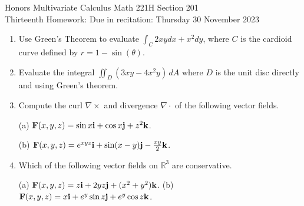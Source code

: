 \documentclass[12pt]{article}
\newcommand{\RR}{{\mathbb R}}  %
\newcommand{\bfF}{{\bf F}}    %
\newcommand{\bfi}{{\bf i}}    %
\newcommand{\bfj}{{\bf j}}    %
\newcommand{\bfk}{{\bf k}}    %
\begin{document}
\LARGE 
\noindent
{\color{Maroon}Honors Multivariate Calculus \hfill Math 221H Section 201}\vspace{2pt}\\
\large
Thirteenth Homework:\hfill 
Due in recitation: Thursday 30 November 2023\vspace{2pt}

\normalsize
    \vspace{2pt}

\begin{enumerate}



\item  
  Use Green's Theorem to evaluate $\int_C 2xy dx + x^2 dy$, where $C$ is the cardioid curve defined by
  $r=1-\sin(\theta)$.\vspace{-2pt}
   
\item
  Evaluate the integral ${\displaystyle \iint_D (3xy -4x^2y)\, dA}$ where $D$ is the unit disc directly and using Green's theorem.
  \vspace{-2pt}

\item Compute the curl $\nabla\times$ and divergence $\nabla \cdot$ of the following vector fields.

  (a) $\bfF(x,y,z) = \sin x \bfi + \cos x \bfj + z^2 \bfk$.


  (b) $\bfF(x,y,z) = e^{xyz}\bfi + \sin(x-y)\bfj - \tfrac{xy}{2}\bfk$.
\vspace{-2pt}
   
\item Which of the following vector fields on $\RR^3$ are conservative.

  (a) $\bfF(x,y,z)=z\bfi + 2yz\bfj + (x^2+y^2)\bfk$.
  \qquad
  (b) $\bfF(x,y,z)= x\bfi + e^y\sin z \bfj + e^y \cos z\bfk$.
\vspace{-2pt}
   

\end{enumerate}
\end{document}
